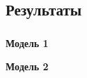 
\subsection{Результаты}

\begin{frame}
\frametitle{\insertsection}
\framesubtitle{\insertsubsection}

\vspace{-0.5cm}
\begin{minipage}[t]{0.47\linewidth}
    \textbf{Модель 1}
\end{minipage}
\hfill
\begin{minipage}[t]{0.47\linewidth}
    \textbf{Модель 2}
\end{minipage}

\end{frame}


% 
% 
% 
% 

